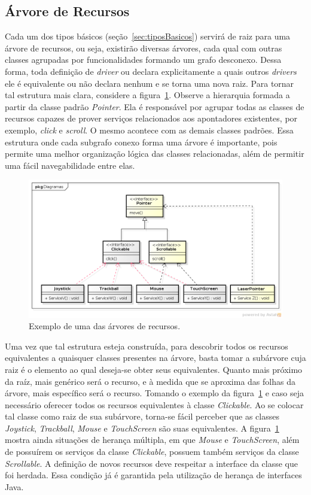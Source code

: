 \subsection{Árvore de Recursos}

Cada um dos tipos básicos (seção~\ref{sec:tiposBasicos}) servirá de raiz para uma árvore de recursos, ou seja, existirão diversas árvores, cada qual com outras classes agrupadas por funcionalidades formando um grafo desconexo. Dessa forma, toda definição de \emph{driver} ou declara explicitamente a quais outros \emph{drivers} ele é equivalente ou não declara nenhum e se torna uma nova raiz. Para tornar tal estrutura mais clara, considere a figura~\ref{fig:arvoreDeRecursos}. Observe a hierarquia formada a partir da classe padrão \emph{Pointer}. Ela é responsável por agrupar todas as classes de recursos capazes de prover serviços relacionados aos apontadores existentes, por exemplo, \emph{click} e \emph{scroll}. O mesmo acontece com as demais classes padrões. Essa estrutura onde cada subgrafo conexo forma uma árvore é importante, pois permite uma melhor organização lógica das classes relacionadas, além de permitir uma fácil navegabilidade entre elas.

\begin{figure}[ht]
	\center
	\includegraphics[scale=0.55]{imagens/arvoreDeRecursos}
	\caption{Exemplo de uma das árvores de recursos.}
	\label{fig:arvoreDeRecursos}
\end{figure}

Uma vez que tal estrutura esteja construída, para descobrir todos os recursos equivalentes a quaisquer classes presentes na árvore, basta tomar a subárvore cuja raiz é o elemento ao qual deseja-se obter seus equivalentes. Quanto mais próximo da raíz, mais genérico será o recurso, e à medida que se aproxima das folhas da árvore, mais específico será o recurso. Tomando o exemplo da figura~\ref{fig:arvoreDeRecursos} e caso seja necessário oferecer todos os recursos equivalentes à classe \emph{Clickable}. Ao se colocar tal classe como raiz de sua subárvore, torna-se fácil perceber que as classes \emph{Joystick}, \emph{Trackball}, \emph{Mouse} e \emph{TouchScreen} são suas equivalentes. A figura~\ref{fig:arvoreDeRecursos} mostra ainda situações de herança múltipla, em que \emph{Mouse} e \emph{TouchScreen}, além de possuírem os serviços da classe \emph{Clickable}, possuem também serviços da classe \emph{Scrollable}. A definição de novos recursos deve respeitar a interface da classe que foi herdada. Essa condição já é garantida pela utilização de herança de interfaces Java.
